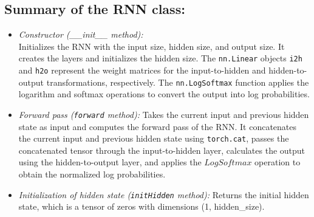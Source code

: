\clearpage
\subsection*{Summary of the RNN class:}

\begin{itemize}
    \item \textit{Constructor (\_\_init\_\_ method):} \\ Initializes the RNN with the input size, hidden size, and output size. It creates the layers and initializes the hidden size. The \texttt{nn.Linear} objects \texttt{i2h} and \texttt{h2o} represent the weight matrices for the input-to-hidden and hidden-to-output transformations, respectively. The \texttt{nn.LogSoftmax} function applies the logarithm and softmax operations to convert the output into log probabilities.
    \item \textit{Forward pass (\texttt{forward} method):} Takes the current input and previous hidden state as input and computes the forward pass of the RNN. It concatenates the current input and previous hidden state using \texttt{torch.cat}, passes the concatenated tensor through the input-to-hidden layer, calculates the output using the hidden-to-output layer, and applies the $LogSoftmax$ operation to obtain the normalized log probabilities.
    \item \textit{Initialization of hidden state (\texttt{initHidden} method):} Returns the initial hidden state, which is a tensor of zeros with dimensions (1, hidden\_size).
\end{itemize}







